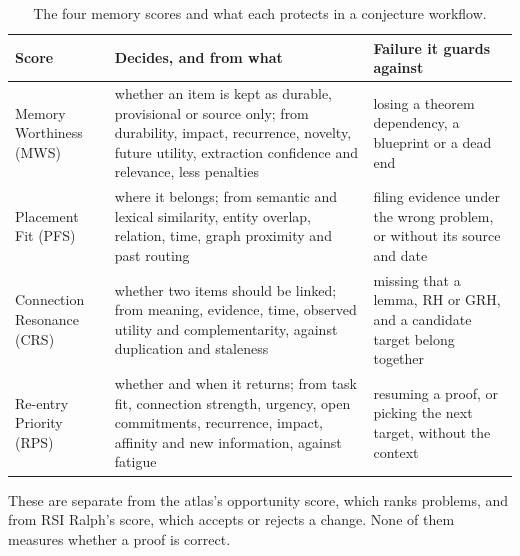 \documentclass[11pt]{amsart}
\begin{document}
\begin{table}[ht]
\small
\begin{tabular}{@{}>{\raggedright\arraybackslash}p{}>{\raggedright\arraybackslash}p{}>{\raggedright\arraybackslash}p{}@{}}
\toprule
Score & Decides, and from what & Failure it guards against\\
\midrule
Memory Worthiness (MWS) & whether an item is kept as durable, provisional or source only; from durability, impact, recurrence, novelty, future utility, extraction confidence and relevance, less penalties & losing a theorem dependency, a blueprint or a dead end\\
\addlinespace
Placement Fit (PFS) & where it belongs; from semantic and lexical similarity, entity overlap, relation, time, graph proximity and past routing & filing evidence under the wrong problem, or without its source and date\\
\addlinespace
Connection Resonance (CRS) & whether two items should be linked; from meaning, evidence, time, observed utility and complementarity, against duplication and staleness & missing that a lemma, RH or GRH, and a candidate target belong together\\
\addlinespace
Re-entry Priority (RPS) & whether and when it returns; from task fit, connection strength, urgency, open commitments, recurrence, impact, affinity and new information, against fatigue & resuming a proof, or picking the next target, without the context\\
\bottomrule
\end{tabular}
\medskip
\caption{The four memory scores and what each protects in a conjecture workflow.}\label{tab:scores}
\end{table}

These are separate from the atlas's opportunity score, which ranks problems, and from RSI Ralph's score, which accepts or rejects a change. None of them measures whether a proof is correct.
\end{document}
